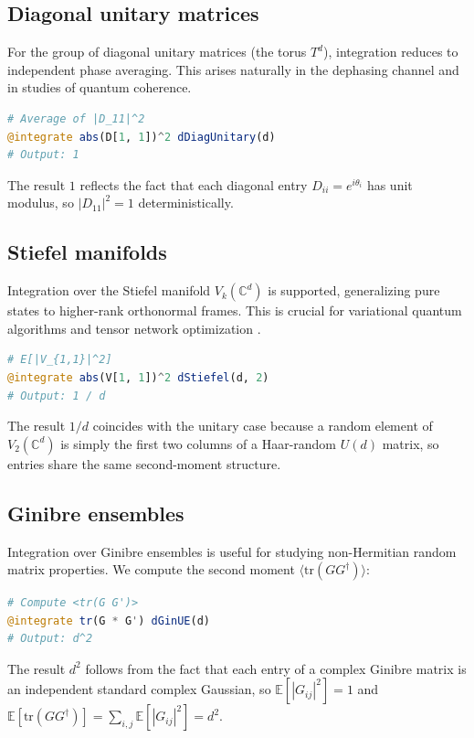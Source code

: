 \documentclass[manuscript,screen]{acmart}
\begin{document}
\subsection{Diagonal unitary matrices}
For the group of diagonal unitary matrices (the torus $T^d$), integration
reduces to independent phase averaging. This arises naturally in the
dephasing channel and in studies of quantum coherence.
\begin{lstlisting}[language=Julia]
# Average of |D_11|^2
@integrate abs(D[1, 1])^2 dDiagUnitary(d)
# Output: 1
\end{lstlisting}

The result $1$ reflects the fact that each diagonal entry $D_{ii} = e^{i\theta_i}$
has unit modulus, so $|D_{11}|^2 = 1$ deterministically.
 
\subsection{Stiefel manifolds}
Integration over the Stiefel manifold $V_k(\mathbb{C}^d)$ is supported,
generalizing pure states to higher-rank orthonormal frames. This is crucial for
variational quantum algorithms and tensor network optimization
\cite{edelman1998geometry}.

\begin{lstlisting}[language=Julia]
# E[|V_{1,1}|^2]
@integrate abs(V[1, 1])^2 dStiefel(d, 2)
# Output: 1 / d
\end{lstlisting}

The result $1/d$ coincides with the unitary case because a random element of
$V_2(\mathbb{C}^d)$ is simply the first two columns of a Haar-random $U(d)$
matrix, so entries share the same second-moment structure.

\subsection{Ginibre ensembles}
Integration over Ginibre ensembles is useful for studying non-Hermitian random
matrix properties. We compute the second moment $\langle \mathrm{tr}(G
G^\dagger) \rangle$:
\begin{lstlisting}[language=Julia]
# Compute <tr(G G')>
@integrate tr(G * G') dGinUE(d)
# Output: d^2
\end{lstlisting}

The result $d^2$ follows from the fact that each entry of a complex Ginibre
matrix is an independent standard complex Gaussian, so $\mathbb{E}[|G_{ij}|^2] = 1$
and $\mathbb{E}[\mathrm{tr}(GG^\dagger)] = \sum_{i,j} \mathbb{E}[|G_{ij}|^2] = d^2$.
\end{document}
